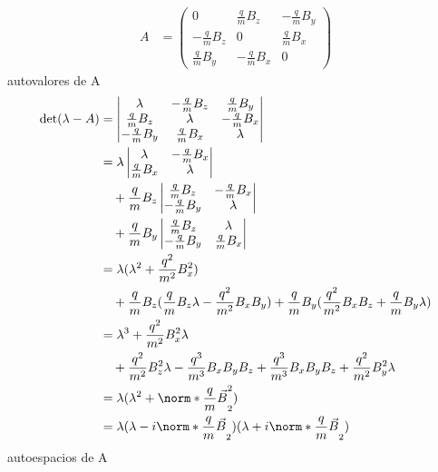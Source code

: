 \documentclass{article}
\begin{document}
  \begin{align}
    A
    &=
    \begin{pmatrix}
      0 
      &\frac{q}{m} B_z
      &- \frac{q}{m} B_y
      \\
      - \frac{q}{m} B_z
      &0
      &\frac{q}{m} B_x
      \\
      \frac{q}{m} B_y
      &- \frac{q}{m} B_x
      &0
    \end{pmatrix}
  \end{align}
  autovalores de A 
  \begingroup
  \allowdisplaybreaks
  \begin{align}
    \det(\lambda - A)
    &=
    \begin{vmatrix}
      \lambda
      &- \frac{q}{m} B_z
      &\frac{q}{m} B_y
      \\
      \frac{q}{m} B_z
      &\lambda
      &- \frac{q}{m} B_x
      \\
      - \frac{q}{m} B_y
      &\frac{q}{m} B_x
      &\lambda
    \end{vmatrix}
    \\
    &=
      \lambda
      \begin{vmatrix}
        \lambda & - \frac{q}{m} B_x \\
        \frac{q}{m} B_x & \lambda
      \end{vmatrix}
    \\
      &\quad
      + \frac{q}{m} B_z
      \begin{vmatrix}
        \frac{q}{m} B_z &- \frac{q}{m} B_x \\
        - \frac{q}{m} B_y &\lambda
      \end{vmatrix}
    \\
      &\quad
      + \frac{q}{m} B_y
      \begin{vmatrix}
        \frac{q}{m} B_z &\lambda \\
        - \frac{q}{m} B_y &\frac{q}{m} B_x
      \end{vmatrix}
    \\
    &=
    \lambda (\lambda^2 + \frac{q^2}{m^2} B_x^2)
    \\
      &\quad
      + \frac{q}{m} B_z (\frac{q}{m} B_z \lambda - \frac{q^2}{m^2} B_x B_y)
      + \frac{q}{m} B_y (\frac{q^2}{m^2} B_x B_z + \frac{q}{m} B_y \lambda)
    \\
    &=
    \lambda^3 + \frac{q^2}{m^2} B_x^2 \lambda
    \\
      &\quad
      + \frac{q^2}{m^2} B_z^2 \lambda - \frac{q^3}{m^3} B_x B_y B_z
      + \frac{q^3}{m^3} B_x B_y B_z + \frac{q^2}{m^2} B_y^2 \lambda
    \\
    &=
    \lambda (\lambda^2 + \norm*{\frac{q}{m}\vec{B}}_2^2)
    \\
    &=
    \lambda (\lambda - i \norm*{\frac{q}{m}\vec{B}}_2) (\lambda + i \norm*{\frac{q}{m}\vec{B}}_2)
  \end{align}
  \endgroup
  autoespacios de A
\end{document}
